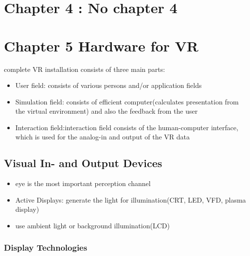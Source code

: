 \documentclass{standalone}
\begin{document}
\section{Chapter 4 : No chapter 4}
\section{Chapter 5 Hardware for VR}
complete VR installation consists of three main parts:
\begin{itemize}
\item User field: consists of various persons and/or application fields
\item Simulation field: consists of efficient computer(calculates presentation from the virtual environment) and also the feedback from the user
\item Interaction field:interaction field consists of the human-computer interface, which is used for the analog-in and output of the VR data 
\end{itemize}
\subsection{Visual In- and Output Devices}
\begin{itemize}
\item eye is the most important perception channel
\item Active Displays: generate the light for illumination(CRT, LED, VFD, plasma display)
\item use ambient light or background illumination(LCD)
\end{itemize}
\subsubsection{Display Technologies}
\end{document}
